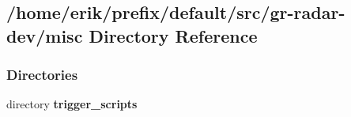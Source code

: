 \subsection{/home/erik/prefix/default/src/gr-\/radar-\/dev/misc Directory Reference}
\label{dir_9d949b0cf2287c3f4f54568785dab90f}
\subsubsection*{Directories}
\begin{DoxyCompactItemize}
\item 
directory {\bf trigger\+\_\+scripts}
\end{DoxyCompactItemize}
